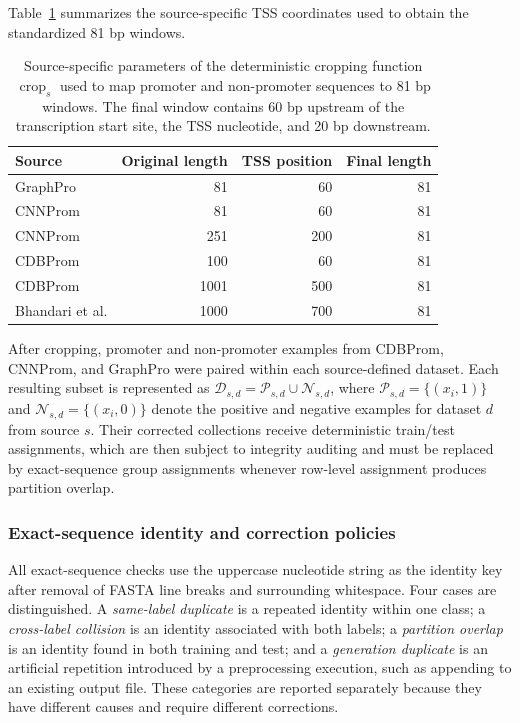 Table~\ref{tab:tss-cropping-parameters} summarizes the source-specific TSS
coordinates used to obtain the standardized 81 bp windows.

\begin{table}[htbp]
\centering
\caption{Source-specific parameters of the deterministic cropping function $\operatorname{crop}_s$ used to map promoter and non-promoter sequences to 81 bp windows. The final window contains 60 bp upstream of the transcription start site, the TSS nucleotide, and 20 bp downstream.}
\label{tab:tss-cropping-parameters}
\begin{tabular}{lrrr}
\hline
Source & Original length & TSS position & Final length \\
\hline
GraphPro & 81 & 60 & 81 \\
CNNProm & 81 & 60 & 81 \\
CNNProm & 251 & 200 & 81 \\
CDBProm & 100 & 60 & 81 \\
CDBProm & 1001 & 500 & 81 \\
Bhandari et al. & 1000 & 700 & 81 \\
\hline
\end{tabular}
\end{table}

After cropping, promoter and non-promoter examples from CDBProm, CNNProm, and
GraphPro were paired within each source-defined dataset. Each resulting subset
is represented as $\mathcal{D}_{s,d}=\mathcal{P}_{s,d}\cup\mathcal{N}_{s,d}$,
where $\mathcal{P}_{s,d}=\{(x_i,1)\}$ and
$\mathcal{N}_{s,d}=\{(x_i,0)\}$ denote the positive and negative examples for
dataset $d$ from source $s$. Their corrected collections receive deterministic
train/test assignments, which are then subject to integrity auditing and must
be replaced by exact-sequence group assignments whenever row-level assignment
produces partition overlap.

\subsubsection{Exact-sequence identity and correction policies}

All exact-sequence checks use the uppercase nucleotide string as the identity
key after removal of FASTA line breaks and surrounding whitespace. Four cases
are distinguished. A \emph{same-label duplicate} is a repeated identity within
one class; a \emph{cross-label collision} is an identity associated with both
labels; a \emph{partition overlap} is an identity found in both training and
test; and a \emph{generation duplicate} is an artificial repetition introduced
by a preprocessing execution, such as appending to an existing output file.
These categories are reported separately because they have different causes
and require different corrections.

